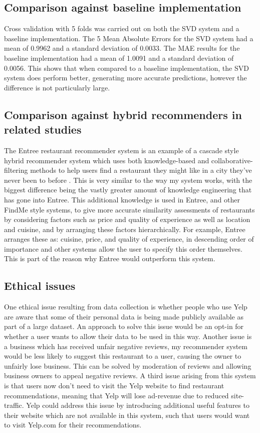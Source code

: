\documentclass[conference]{IEEEtran}
\begin{document}
\subsection{Comparison against baseline implementation}
Cross validation with 5 folds was carried out on both the SVD system and a baseline implementation. 
The 5 Mean Absolute Errors for the SVD system had a mean of 0.9962 and a standard deviation of 0.0033. 
The MAE results for the baseline implementation had a mean of 1.0091 and a standard deviation of 0.0056. 
This shows that when compared to a baseline implementation, the SVD system does perform better, generating more 
accurate predictions, however the difference is not particularly large. 

\subsection{Comparison against hybrid recommenders in related studies}
The Entree restaurant recommender system is an example of a cascade style hybrid recommender system which 
uses both knowledge-based and collaborative-filtering methods to help users find a restaurant they might like in 
a city they've never been to before \cite{burke1999integrating,burke2000knowledge,burke2002hybrid,burke2007hybrid}. 
This is very similar to the way my system works, with the biggest difference being the vastly greater amount of 
knowledge engineering that has gone into Entree. 
This additional knowledge is used in Entree, and other FindMe style systems, to give more accurate similarity assessments 
of restaurants by considering factors such as price and quality of experience as well as location and cuisine, 
and by arranging these factors hierarchically. 
For example, Entree arranges these as: cuisine, price, and quality of experience, in descending order of importance 
and other systems allow the user to specify this order themselves. 
This is part of the reason why Entree would outperform this system. 

\subsection{Ethical issues}
One ethical issue resulting from data collection is whether people who use Yelp are aware that some of their 
personal data is being made publicly available as part of a large dataset. 
An approach to solve this issue would be an opt-in for whether a user wants to allow their data to be used in this way. 
Another issue is a business which has received unfair negative reviews, my recommender system would be less likely to 
suggest this restaurant to a user, causing the owner to unfairly lose business. 
This can be solved by moderation of reviews and allowing business owners to appeal negative reviews. 
A third issue arising from this system is that users now don't need to visit the Yelp website to find restaurant 
recommendations, meaning that Yelp will lose ad-revenue due to reduced site-traffic. 
Yelp could address this issue by introducing additional useful features to their website which are not available in 
this system, such that users would want to visit Yelp.com for their recommendations. 
\end{document}
